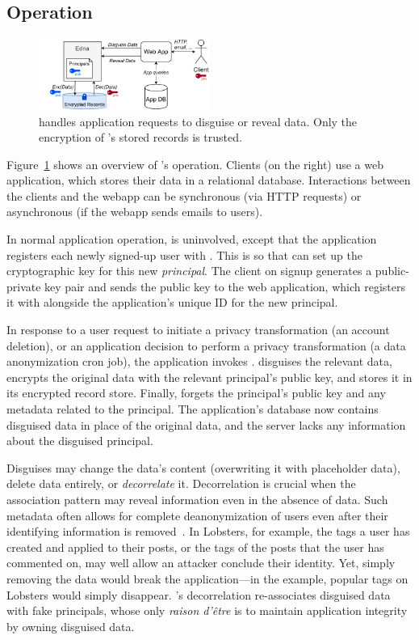 \subsection{\sys Operation}

\begin{figure}[t]
  \centering
    \includegraphics[width=0.5\textwidth]{figs/edna_arch}
  \caption{\sys handles application requests to disguise or reveal data. Only the
    encryption of \sys's stored records is trusted.}
  \label{f:edna-overview}
\end{figure}

%
Figure~\ref{f:edna-overview} shows an overview of \sys's operation.
%
Clients (on the right) use a web application, which stores their data in a
relational database.
%
Interactions between the clients and the webapp can be synchronous (via HTTP
requests) or asynchronous (\eg if the webapp sends emails to users).
%

%
In normal application operation, \sys is uninvolved, except that the application
registers each newly signed-up user with \sys.
%
This is so that \sys can set up the cryptographic key for this new \emph{principal}.
%
The client on signup generates a public-private key pair and sends the public
key to the web application, which registers it with \sys alongside the
application's unique ID for the new principal.
%

%
In response to a user request to initiate a privacy transformation (\eg an account
deletion), or an application decision to perform a privacy transformation (\eg a
data anonymization cron job), the application invokes \sys.
%
\sys disguises the relevant data, encrypts the original data with the relevant
principal's public key, and stores it in its encrypted record store.
%
Finally, \sys forgets the principal's public key and any metadata related to the
principal.
%
The application's database now contains disguised data in place of the original
data, and the server lacks any information about the disguised principal.
%

%
Disguises may change the data's content (\eg overwriting it with placeholder data),
delete data entirely, or \emph{decorrelate} it.
%
Decorrelation is crucial when the association pattern may reveal information
even in the absence of data.
%
Such metadata often allows for complete deanonymization of users even after their
identifying information is removed~\cite{xxx}.
%
In Lobsters, for example, the tags a user has created and applied to their posts,
or the tags of the posts that the user has commented on, may well allow an attacker
conclude their identity.
%
Yet, simply removing the data would break the application---in the example,
popular tags on Lobsters would simply disappear.
%
\sys's decorrelation re-associates disguised data with fake principals, whose
only \emph{raison d'être} is to maintain application integrity by owning disguised
data.
%

